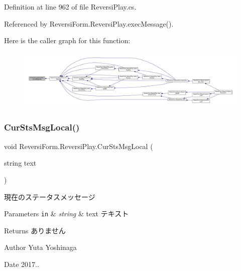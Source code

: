 Definition at line 962 of file Reversi\+Play.\+cs.



Referenced by Reversi\+Form.\+Reversi\+Play.\+exec\+Message().

Here is the caller graph for this function\+:
\nopagebreak
\begin{figure}[H]
\begin{center}
\leavevmode
\includegraphics[width=350pt]{class_reversi_form_1_1_reversi_play_a9b4d5bd01207c648cc80f018fbba9519_icgraph}
\end{center}
\end{figure}
\mbox{\label{class_reversi_form_1_1_reversi_play_af2e634847166a90c717aa19ae8aee6b7}} 
\subsubsection{\texorpdfstring{Cur\+Sts\+Msg\+Local()}{CurStsMsgLocal()}}
{\footnotesize\ttfamily void Reversi\+Form.\+Reversi\+Play.\+Cur\+Sts\+Msg\+Local (\begin{DoxyParamCaption}\item[{string}]{text }\end{DoxyParamCaption})\hspace{0.3cm}{\ttfamily [private]}}



現在のステータスメッセージ 


\begin{DoxyParams}[1]{Parameters}
\mbox{\tt in}  & {\em string} & text テキスト \\
\hline
\end{DoxyParams}
\begin{DoxyReturn}{Returns}
ありません 
\end{DoxyReturn}
\begin{DoxyAuthor}{Author}
Yuta Yoshinaga 
\end{DoxyAuthor}
\begin{DoxyDate}{Date}
2017.. 
\end{DoxyDate}



